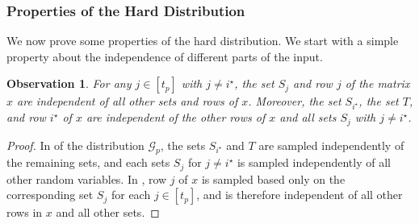\documentclass[11pt]{article}
\newtheorem{observation}[lemma]{Observation}
\theoremstyle{definition}
\newcommand{\cG}{\ensuremath{\mathcal{G}}}
\newcommand{\cliqnum}[2]{\ensuremath{C^{(#1)}_{#2}}}
\newcommand{\istar}{\ensuremath{i^{\star}}}
\begin{document}
	\subsubsection{Properties of the Hard Distribution} \label{subsec:adv-properties}
We now prove some properties of the hard distribution. 
		We start with a simple property about the independence of different parts of the input.
		
		\begin{observation}\label{obs:rows-independent}
		For any $j \in [t_p]$ with $j \neq \istar$, the set $S_j$ and row $j$ of the matrix $x$ are independent of all other sets and rows of $x$. Moreover, the set $S_{\istar}$, the set $T$, and row $\istar$ of $x$ are independent of the other rows of $x$ and all sets $S_j$ with $j \neq \istar$. 
		\end{observation}
		\begin{proof}
			In  of the distribution $\cG_p$, the sets $S_{\istar}$ and $T$ are sampled independently of the remaining sets, and each sets $S_j$ for $j \neq \istar$ is sampled independently of all other random variables. In , row $j$ of $x$ is sampled based only on the corresponding set $S_j$ for each $j \in [t_p]$, and is therefore independent of all other rows in $x$ and all other sets.
		\end{proof}
		

\end{document}
